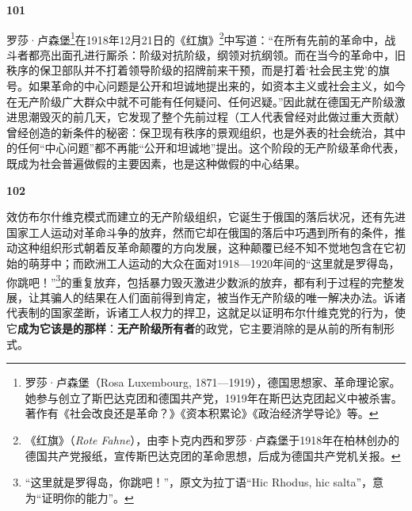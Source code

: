 \documentclass[fontset=fandol, a4paper, 12pt, openright]{ctexbook}
\makeatletter
\newcommand{\thesis}[1]{%
    \par\vspace{1.5em}%
    {\centering \textbf{\Large #1}\par}%
    \nobreak\vspace{0.5em}\nobreak
    \@afterindenttrue %
    \@afterheading    %
}
\makeatother
\begin{document}
\thesis{101}
罗莎·卢森堡\footnote{罗莎·卢森堡（Rosa Luxembourg, 1871—1919），德国思想家、革命理论家。她参与创立了斯巴达克团和德国共产党，1919年在斯巴达克团起义中被杀害。著作有《社会改良还是革命？》《资本积累论》《政治经济学导论》等。}在1918年12月21日的《红旗》\footnote{《红旗》（\textit{Rote Fahne}），由李卜克内西和罗莎·卢森堡于1918年在柏林创办的德国共产党报纸，宣传斯巴达克团的革命思想，后成为德国共产党机关报。}中写道：“在所有先前的革命中，战斗者都亮出面孔进行厮杀：阶级对抗阶级，纲领对抗纲领。而在当今的革命中，旧秩序的保卫部队并不打着领导阶级的招牌前来干预，而是打着‘社会民主党’的旗号。如果革命的中心问题是公开和坦诚地提出来的，如资本主义或社会主义，如今在无产阶级广大群众中就不可能有任何疑问、任何迟疑。”因此就在德国无产阶级激进思潮毁灭的前几天，它发现了整个先前过程（工人代表曾经对此做过重大贡献）曾经创造的新条件的秘密：保卫现有秩序的景观组织，也是外表的社会统治，其中的任何“中心问题”都不再能“公开和坦诚地”提出。这个阶段的无产阶级革命代表，既成为社会普遍做假的主要因素，也是这种做假的中心结果。

\thesis{102}
效仿布尔什维克模式而建立的无产阶级组织，它诞生于俄国的落后状况，还有先进国家工人运动对革命斗争的放弃，然而它却在俄国的落后中巧遇到所有的条件，推动这种组织形式朝着反革命颠覆的方向发展，这种颠覆已经不知不觉地包含在它初始的萌芽中；而欧洲工人运动的大众在面对1918—1920年间的“这里就是罗得岛，你跳吧！”\footnote{“这里就是罗得岛，你跳吧！”，原文为拉丁语“Hic Rhodus, hic salta”，意为“证明你的能力”。}的重复放弃，包括暴力毁灭激进少数派的放弃，都有利于过程的完整发展，让其骗人的结果在人们面前得到肯定，被当作无产阶级的唯一解决办法。诉诸代表制的国家垄断，诉诸工人权力的捍卫，这就足以证明布尔什维克党的行为，使它\textbf{成为它该是的那样}：\textbf{无产阶级所有者}的政党，它主要消除的是从前的所有制形式。
\end{document}
